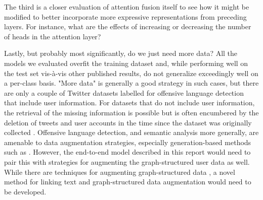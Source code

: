 \documentclass[letterpaper]{article} %
\begin{document}
The third is a closer evaluation of attention fusion itself to see how it might be modified to better incorporate more expressive representations from preceding layers. For instance, what are the effects of increasing or decreasing the number of heads in the attention layer?

Lastly, but probably most significantly, do we just need more data? All the models we evaluated overfit the training dataset and, while performing well on the test set vis-\`a-vis other published results, do not generalize exceedingly well on a per-class basis. "More data" is generally a good strategy in such cases, but there are only a couple of Twitter datasets labelled for offensive language detection that include user information. For datasets that do not include user information, the retrieval of the missing information is possible but is often encumbered by the deletion of tweets and user accounts in the time since the dataset was originally collected \citep{Mishra2018}. Offensive language detection, and semantic analysis more generally, are amenable to data augmentation strategies, especially generation-based methods such as \citet{liu2020}. However, the end-to-end model described in this report would need to pair this with strategies for augmenting the graph-structured user data as well. While there are techniques for augmenting graph-structured data \citep{zhao2022}, a novel method for linking text and graph-structured data augmentation would need to be developed.

\appendix


\end{document}
